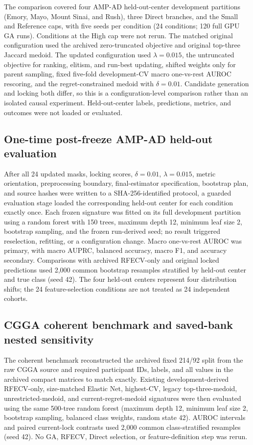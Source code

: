 The comparison covered four AMP-AD held-out-center development partitions (Emory, Mayo, Mount Sinai, and Rush), three Direct branches, and the Small and Reference caps, with five seeds per condition (24 conditions; 120 full GPU GA runs). Conditions at the High cap were not rerun. The matched original configuration used the archived zero-truncated objective and original top-three Jaccard medoid. The updated configuration used \(\lambda=0.015\), the untruncated objective for ranking, elitism, and run-best updating, shifted weights only for parent sampling, fixed five-fold development-CV macro one-vs-rest AUROC rescoring, and the regret-constrained medoid with \(\delta=0.01\). Candidate generation and locking both differ, so this is a configuration-level comparison rather than an isolated causal experiment. Held-out-center labels, predictions, metrics, and outcomes were not loaded or evaluated.

\subsection{One-time post-freeze AMP-AD held-out evaluation}

After all 24 updated masks, locking scores, \(\delta=0.01\), \(\lambda=0.015\), metric orientation, preprocessing boundary, final-estimator specification, bootstrap plan, and source hashes were written to a SHA-256-identified protocol, a guarded evaluation stage loaded the corresponding held-out center for each condition exactly once. Each frozen signature was fitted on its full development partition using a random forest with 150 trees, maximum depth 12, minimum leaf size 2, bootstrap sampling, and the frozen run-derived seed; no result triggered reselection, refitting, or a configuration change. Macro one-vs-rest AUROC was primary, with macro AUPRC, balanced accuracy, macro F1, and accuracy secondary. Comparisons with archived RFECV-only and original locked predictions used 2,000 common bootstrap resamples stratified by held-out center and true class (seed 42). The four held-out centers represent four distribution shifts; the 24 feature-selection conditions are not treated as 24 independent cohorts.

\subsection{CGGA coherent benchmark and saved-bank nested sensitivity}

The coherent benchmark reconstructed the archived fixed 214/92 split from the raw CGGA source and required participant IDs, labels, and all values in the archived compact matrices to match exactly. Existing development-derived RFECV-only, size-matched Elastic Net, highest-CV, legacy top-three-medoid, unrestricted-medoid, and current-regret-medoid signatures were then evaluated using the same 500-tree random forest (maximum depth 12, minimum leaf size 2, bootstrap sampling, balanced class weights, random state 42). AUROC intervals and paired current-lock contrasts used 2,000 common class-stratified resamples (seed 42). No GA, RFECV, Direct selection, or feature-definition step was rerun.

